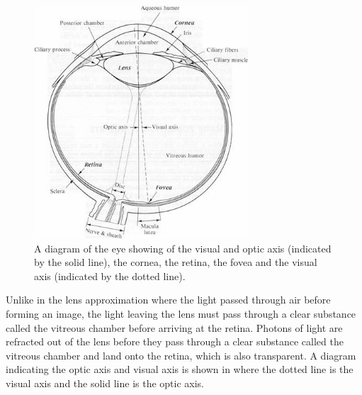 \begin{figure}[H]
\centering
  \includegraphics[width=8cm]{figures/eye_diagram}
\caption{A diagram of the eye showing of the visual
 	  and optic axis (indicated by the solid line), the cornea, the retina, the fovea
              and the visual axis (indicated by the dotted line).\cite{yannuzzi2011retinal}}
\label{fig:optic_axis}
\end{figure}

Unlike in the lens approximation where the light passed through air before forming an
image, the light leaving the lens must pass through a clear substance called the
vitreous chamber before arriving at the retina. Photons of light are refracted out of the
lens before they pass through a clear substance called the vitreous chamber and land
onto the retina, which is also transparent. A diagram indicating the optic axis and
visual axis is shown in  where the dotted line is the visual axis and
the solid line is the optic axis.

